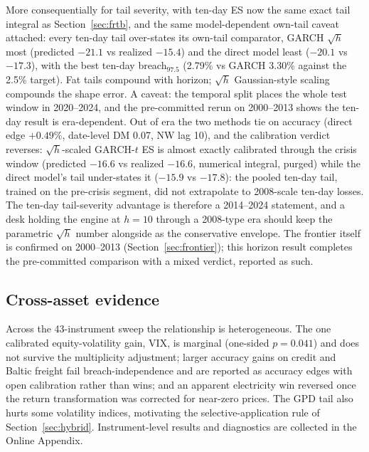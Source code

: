 \documentclass[11pt]{article}
\theoremstyle{remark}
\begin{document}
More consequentially for tail severity, with ten-day ES now the same exact tail integral as Section~\ref{sec:frtb}, and the same
model-dependent own-tail caveat attached: every ten-day tail
over-states its own-tail comparator, GARCH $\sqrt{h}$ most (predicted
$-21.1$ vs realized $-15.4$) and the direct model least
($-20.1$ vs $-17.3$), with the best ten-day breach$_{97.5}$ (2.79\%
vs GARCH 3.30\% against the 2.5\% target). Fat
tails compound with horizon; $\sqrt{h}$ Gaussian-style scaling
compounds the shape error. A caveat: the temporal split places the whole
test window in 2020--2024, and the pre-committed rerun on 2000--2013 shows
the ten-day result is era-dependent. Out of era the two methods tie on
accuracy (direct edge $+0.49\%$, date-level DM 0.07, NW lag 10), and
the calibration verdict reverses: $\sqrt{h}$-scaled GARCH-$t$ ES is
almost exactly calibrated through the crisis window (predicted
$-16.6$ vs realized $-16.6$, numerical integral, purged) while the
direct model's tail under-states it ($-15.9$ vs $-17.8$): the pooled ten-day tail,
trained on the pre-crisis segment, did not extrapolate to 2008-scale
ten-day losses. The ten-day tail-severity advantage
is therefore a 2014--2024 statement,
and a desk holding the engine at $h=10$ through a 2008-type era should
keep the parametric $\sqrt{h}$ number alongside as the conservative
envelope. The frontier itself is confirmed on 2000--2013
(Section~\ref{sec:frontier}); this horizon result completes the
pre-committed comparison with a mixed verdict, reported as such.

\subsection{Cross-asset evidence}

Across the 43-instrument sweep the relationship is heterogeneous. The
one calibrated equity-volatility gain, VIX, is marginal (one-sided
$p=0.041$) and does not survive the multiplicity adjustment; larger
accuracy gains on credit and Baltic freight fail breach-independence and
are reported as accuracy edges with open calibration rather than wins;
and an apparent electricity win reversed once the return transformation
was corrected for near-zero prices. The GPD tail also hurts some
volatility indices, motivating the selective-application rule of
Section~\ref{sec:hybrid}. Instrument-level results and diagnostics are
collected in the Online Appendix.
\end{document}
